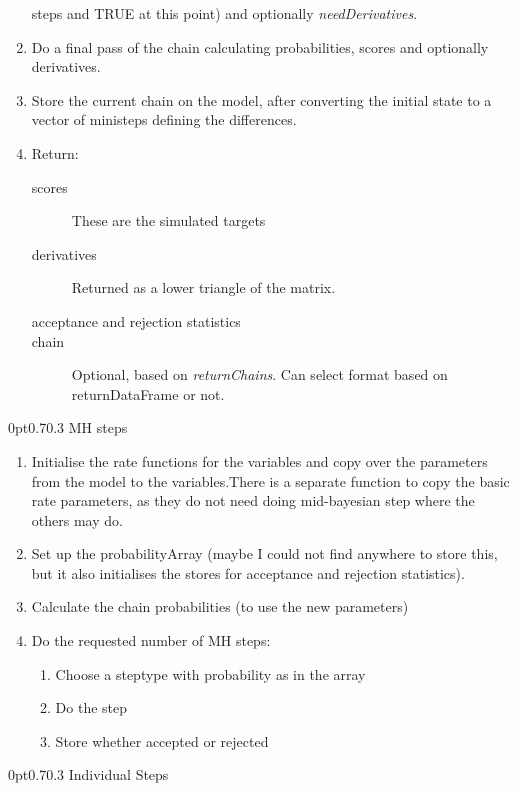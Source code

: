 \documentclass[12pt,a4paper]{article}
\makeatletter
\renewcommand{\=}{\,=\,}
\newcommand{\+}{\,+\,}
\newcommand{\nnm}[1]{\textsf{\small\textit{#1}}}
\renewcommand{\subsection}{\@startsection{subsection}{2}
                {0pt}{0.7\baselineskip}{0.3\baselineskip}
                {\sffamily} }
\makeatother
\begin{document}
\begin{enumerate}
  steps and TRUE at this point) and optionally \nnm{needDerivatives}.
\item Do a final pass of the chain calculating probabilities, scores and
  optionally derivatives.
\item Store the current chain on the model, after converting the initial state
  to a vector of ministeps defining the differences.
\item Return:
\begin{description}
\item[scores] These are the simulated targets
\item[derivatives] Returned as a lower triangle of the matrix.
\item[acceptance and rejection statistics]
\item[chain] Optional, based on \nnm{returnChains}. Can select format based on
  returnDataFrame or not.
\end{description}
\end{enumerate}

\subsection{MH steps}
\label{sec:mh}
\begin{enumerate}
\item Initialise the rate functions for the variables and copy over the
  parameters from the model to the variables.There is a separate function to copy
  the basic rate parameters, as they do not need doing mid-bayesian step where
  the others may do.
\item Set up the probabilityArray (maybe I could not find anywhere to store
  this, but it also initialises the stores for acceptance and rejection
  statistics).
\item Calculate the chain probabilities (to use the new parameters)
\item Do the requested number of MH steps:
\begin{enumerate}
\item Choose a steptype with probability as in the array
\item Do the step
\item Store whether accepted or rejected
\end{enumerate}
\end{enumerate}
\subsection{Individual Steps}
\end{document}
